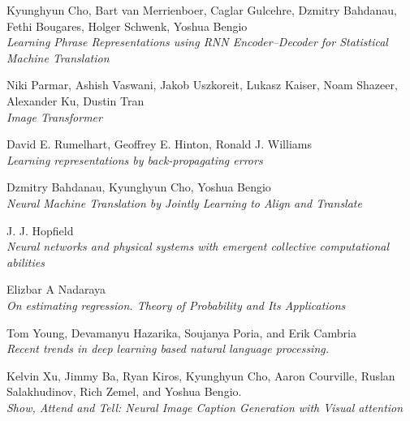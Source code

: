 \documentclass[11pt]{article}
\begin{document}
\begin{thebibliography}{9}
Kyunghyun Cho, Bart van Merrienboer, Caglar Gulcehre, Dzmitry Bahdanau, Fethi Bougares, Holger Schwenk, Yoshua Bengio \\
\textit{Learning Phrase Representations using RNN Encoder–Decoder for Statistical Machine Translation}

Niki Parmar, Ashish Vaswani, Jakob Uszkoreit, Lukasz Kaiser, Noam Shazeer, Alexander Ku, Dustin Tran \\
\textit{Image Transformer}

David E. Rumelhart, Geoffrey E. Hinton, Ronald J. Williams \\
\textit{Learning representations by back-propagating errors}

Dzmitry Bahdanau, Kyunghyun Cho, Yoshua Bengio\\
\textit{Neural Machine Translation by Jointly Learning to Align and Translate}

J. J. Hopfield\\
\textit{Neural networks and physical systems with emergent collective computational abilities}

Elizbar A Nadaraya \\
\textit{On estimating regression. Theory of Probability and Its Applications}

Tom Young, Devamanyu Hazarika, Soujanya Poria, and Erik Cambria \\
\textit{Recent trends in deep learning based natural language processing.}

Kelvin Xu, Jimmy Ba, Ryan Kiros, Kyunghyun Cho, Aaron Courville, Ruslan Salakhudinov, Rich Zemel, and Yoshua Bengio. \\
\textit{Show, Attend and Tell: Neural Image Caption Generation with Visual attention}























\end{thebibliography}
\end{document}
